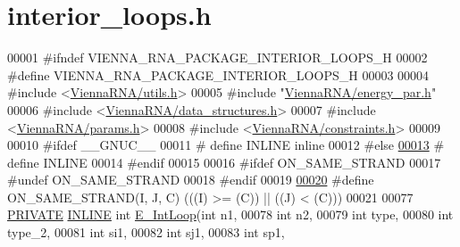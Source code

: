 \hypertarget{interior__loops_8h_source}{}\section{interior\+\_\+loops.\+h}
\label{interior__loops_8h_source}

\begin{DoxyCode}
00001 \textcolor{preprocessor}{#ifndef VIENNA\_RNA\_PACKAGE\_INTERIOR\_LOOPS\_H}
00002 \textcolor{preprocessor}{#define VIENNA\_RNA\_PACKAGE\_INTERIOR\_LOOPS\_H}
00003 
00004 \textcolor{preprocessor}{#include <\mbox{\hyperlink{utils_8h}{ViennaRNA/utils.h}}>}
00005 \textcolor{preprocessor}{#include "\mbox{\hyperlink{energy__par_8h}{ViennaRNA/energy\_par.h}}"}
00006 \textcolor{preprocessor}{#include <\mbox{\hyperlink{data__structures_8h}{ViennaRNA/data\_structures.h}}>}
00007 \textcolor{preprocessor}{#include <\mbox{\hyperlink{params_8h}{ViennaRNA/params.h}}>}
00008 \textcolor{preprocessor}{#include <\mbox{\hyperlink{constraints_8h}{ViennaRNA/constraints.h}}>}
00009 
00010 \textcolor{preprocessor}{#ifdef \_\_GNUC\_\_}
00011 \textcolor{preprocessor}{# define INLINE inline}
00012 \textcolor{preprocessor}{#else}
\mbox{\hyperlink{interior__loops_8h_a2eb6f9e0395b47b8d5e3eeae4fe0c116}{00013}} \textcolor{preprocessor}{# define INLINE}
00014 \textcolor{preprocessor}{#endif}
00015 
00016 \textcolor{preprocessor}{#ifdef ON\_SAME\_STRAND}
00017 \textcolor{preprocessor}{#undef ON\_SAME\_STRAND}
00018 \textcolor{preprocessor}{#endif}
00019 
\mbox{\hyperlink{interior__loops_8h_a6b109d72bf39073254090cf105a17641}{00020}} \textcolor{preprocessor}{#define ON\_SAME\_STRAND(I, J, C)  (((I) >= (C)) || ((J) < (C)))}
00021 
00077 \mbox{\hyperlink{edit__cost_8h_a5e151c615eda34903514212f05a5ccf8}{PRIVATE}} \mbox{\hyperlink{interior__loops_8h_a2eb6f9e0395b47b8d5e3eeae4fe0c116}{INLINE}} \textcolor{keywordtype}{int} \mbox{\hyperlink{group__loops_gaafbc187b7f78e8e82afb77dd6f3b8fc5}{E\_IntLoop}}(\textcolor{keywordtype}{int}          n1,
00078                              \textcolor{keywordtype}{int}          n2,
00079                              \textcolor{keywordtype}{int}          type,
00080                              \textcolor{keywordtype}{int}          type\_2,
00081                              \textcolor{keywordtype}{int}          si1,
00082                              \textcolor{keywordtype}{int}          sj1,
00083                              \textcolor{keywordtype}{int}          sp1,

\end{DoxyCode}
